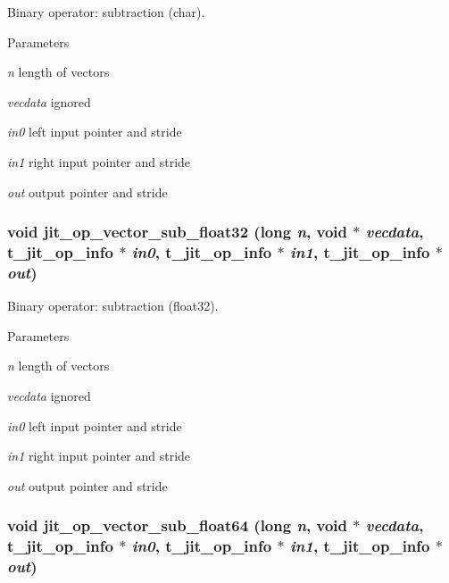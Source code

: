 Binary operator: subtraction (char). 
\begin{DoxyParams}{Parameters}
\item[{\em n}]length of vectors \item[{\em vecdata}]ignored \item[{\em in0}]left input pointer and stride \item[{\em in1}]right input pointer and stride \item[{\em out}]output pointer and stride \end{DoxyParams}
\hypertarget{group__opvecmod_ga1ef0e86107326c19fbe174b99aa8fb35}{
\subsubsection[{jit\_\-op\_\-vector\_\-sub\_\-float32}]{\setlength{\rightskip}{0pt plus 5cm}void jit\_\-op\_\-vector\_\-sub\_\-float32 (long {\em n}, \/  void $\ast$ {\em vecdata}, \/  {\bf t\_\-jit\_\-op\_\-info} $\ast$ {\em in0}, \/  {\bf t\_\-jit\_\-op\_\-info} $\ast$ {\em in1}, \/  {\bf t\_\-jit\_\-op\_\-info} $\ast$ {\em out})}}
\label{group__opvecmod_ga1ef0e86107326c19fbe174b99aa8fb35}


Binary operator: subtraction (float32). 
\begin{DoxyParams}{Parameters}
\item[{\em n}]length of vectors \item[{\em vecdata}]ignored \item[{\em in0}]left input pointer and stride \item[{\em in1}]right input pointer and stride \item[{\em out}]output pointer and stride \end{DoxyParams}
\hypertarget{group__opvecmod_gaccb4600e174f75b40a45144986dbfe01}{
\subsubsection[{jit\_\-op\_\-vector\_\-sub\_\-float64}]{\setlength{\rightskip}{0pt plus 5cm}void jit\_\-op\_\-vector\_\-sub\_\-float64 (long {\em n}, \/  void $\ast$ {\em vecdata}, \/  {\bf t\_\-jit\_\-op\_\-info} $\ast$ {\em in0}, \/  {\bf t\_\-jit\_\-op\_\-info} $\ast$ {\em in1}, \/  {\bf t\_\-jit\_\-op\_\-info} $\ast$ {\em out})}}
\label{group__opvecmod_gaccb4600e174f75b40a45144986dbfe01}


